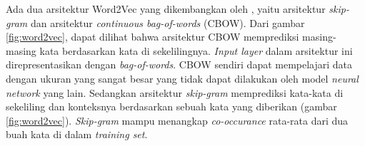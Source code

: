 Ada dua arsitektur Word2Vec yang dikembangkan oleh \cite{mikolov2014word2vec}, yaitu arsitektur \textit{skip-gram} dan arsitektur \textit{continuous bag-of-words} (CBOW). Dari gambar \ref{fig:word2vec}, dapat dilihat bahwa arsitektur CBOW memprediksi masing-masing kata berdasarkan kata di sekelilingnya. \textit{Input layer} dalam arsitektur ini direpresentasikan dengan \textit{bag-of-words}. CBOW sendiri dapat mempelajari data dengan ukuran yang sangat besar yang tidak dapat dilakukan oleh model \textit{neural network} yang lain. Sedangkan arsitektur \textit{skip-gram} memprediksi kata-kata di sekeliling dan konteksnya berdasarkan sebuah kata yang diberikan (gambar \ref{fig:word2vec}). \textit{Skip-gram} mampu menangkap \textit{co-occurance} rata-rata dari dua buah kata di dalam \textit{training set}.

